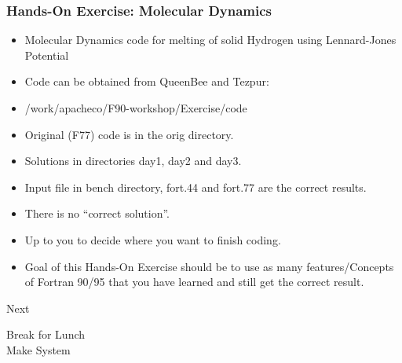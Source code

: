 \documentclass[slidestop,mathserif,compress,xcolor=svgnames]{beamer}
\begin{document}
\begin{frame}
  \frametitle{\small Hands-On Exercise: Molecular Dynamics}
  \begin{itemize}
    \item Molecular Dynamics code for melting of solid Hydrogen using Lennard-Jones Potential
    \item Code can be obtained from QueenBee and Tezpur:
    \item[]/work/apacheco/F90-workshop/Exercise/code
    \item Original (F77) code is in the orig directory.
    \item Solutions in directories day1, day2 and day3.
    \item Input file in bench directory, fort.44 and fort.77 are the correct results.
    \item There is no ``correct solution''.
    \item Up to you to decide where you want to finish coding.
    \item Goal of this Hands-On Exercise should be to use as many features/Concepts of Fortran 90/95 that you have learned and still get the correct result.
  \end{itemize}
  \begin{block}{Next}
    \begin{center}
      \Large{Break for Lunch \\ Make System}
    \end{center}
  \end{block}
\end{frame}
\end{document}
